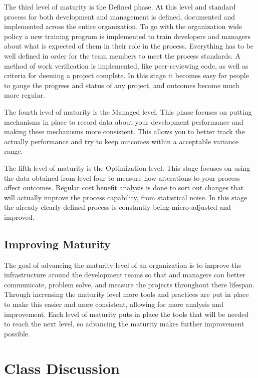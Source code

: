 \documentclass[11pt, indentfirst]{article}
\begin{document}
  The third level of maturity is the Defined phase. At this level and standard process for both development and management is defined, documented and implemented
  across the entire organization. To go with the organization wide policy a new training program is implemented to train developers and managers about what is
  expected of them in their role in the process. Everything has to be well defined in order for the team members to meet the process standards. A method of
  work verification is implemented, like peer-reviewing code, as well as criteria for deeming a project complete. In this stage it becomes easy for
  people to gauge the progress and status of any project, and outcomes become much more regular.

  The fourth level of maturity is the Managed level. This phase focuses on putting mechanisms in place to record data about your development performance and making these
  mechanisms more consistent. This allows you to better track the actually performance and try to keep outcomes within a acceptable variance range.

  The fifth level of maturity is the Optimization level. This stage focuses on using the data obtained from level four to measure how alterations to your process affect outcomes.
  Regular cost benefit analysis is done to sort out changes that will actually improve the process capability, from statistical noise. In this stage the already clearly defined
  process is constantly being micro adjusted and improved.

  \subsection{Improving Maturity}

  The goal of advancing the maturity level of an organization is to improve the infrastructure around the development teams so that and managers can better communicate,
  problem solve, and measure the projects throughout there lifespan. Through increasing the maturity level more tools and practices are put in place to make this easier
  and more consistent, allowing for more analysis and improvement. Each level of maturity puts in place the tools that will be needed to reach the next level, so advancing
  the maturity makes further improvement possible.
  \clearpage
  \section{Class Discussion}
\end{document}
